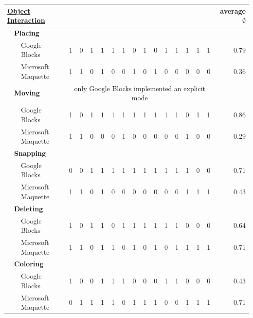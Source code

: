\documentclass{report}
\begin{document}
		\begin{table}[H]
			\begin{center}
			\begin{tabular}{@{}|lll|llllllllllllll|r|@{}}
				\hline
				\multicolumn{3}{|l|}{\textbf{\underline{Object Interaction}}} & & & & & & & & & & & & & & & \textbf{average $\emptyset$} \\ \hline
				& \multicolumn{2}{l|}{\textbf{Placing}} & & & & & & & & & & & & & & &\\ \hline
				& & Google Blocks & 1 & 0 & 1 & 1 & 1 & 1 & 0 & 1 & 0 & 1 & 1 & 1 & 1 & 1 & 0.79 \\
				& & Microsoft Maquette & 1 & 1 & 0 & 1 & 0 & 0 & 1 & 0 & 1 & 0 & 0 & 0 & 0 & 0 & 0.36 \\ \hline
				
				& \multicolumn{2}{l|}{\textbf{Moving}} & \multicolumn{14}{c|}{\small{only Google Blocks implemented an explicit mode}} &\\ \hline
				& & Google Blocks & 1 & 0 & 1 & 1 & 1 & 1 & 1 & 1 & 1 & 1 & 1 & 0 & 1 & 1 & 0.86 \\
				& & Microsoft Maquette & 1 & 1 & 0 & 0 & 0 & 1 & 0 & 0 & 0 & 0 & 0 & 1 & 0 & 0 & 0.29 \\ \hline
				
				& \multicolumn{2}{l|}{\textbf{Snapping}} & & & & & & & & & & & & & & &\\ \hline
				& & Google Blocks & 0 & 0 & 1 & 1 & 1 & 1 & 1 & 1 & 1 & 1 & 1 & 1 & 0 & 0 & 0.71 \\
				& & Microsoft Maquette & 1 & 1 & 0 & 1& 0 & 0 & 0 & 0 & 0 & 0 & 0 & 1 & 1 & 1 & 0.43 \\ \hline
				
				& \multicolumn{2}{l|}{\textbf{Deleting}} & & & & & & & & & & & & & & &\\ \hline
				& & Google Blocks & 1 & 0 & 1 & 1 & 0 & 1 & 1 & 1 & 1 & 1 & 1 & 0 & 0 & 0 & 0.64 \\
				& & Microsoft Maquette & 1 & 1 & 0 & 1 & 1 & 0 & 1 & 0 & 1 & 0 & 1 & 1 & 1& 1 & 0.71\\ \hline
				
				& \multicolumn{2}{l|}{\textbf{Coloring}} & & & & & & & & & & & & & & &\\ \hline
				& & Google Blocks & 1 & 0 & 0 & 1 & 1 & 1 & 0 & 0 & 0 & 1 & 1 & 0 & 0 & 0 & 0.43 \\
				& & Microsoft Maquette & 0 & 1 & 1 & 1 & 1 & 0 & 1 & 1 & 1 & 0 & 0 & 1 & 1 & 1 & 0.71 \\ \hline
				

\end{tabular}
\end{center}
\end{table}
\end{document}
